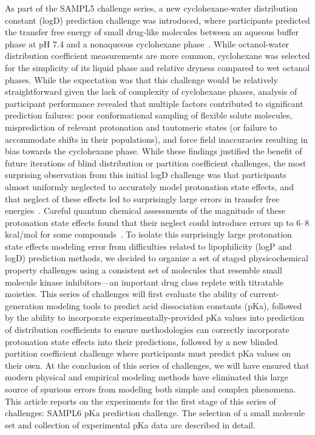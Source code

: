 \documentclass[9pt,lineno]{elife}
\begin{document}
As part of the SAMPL5 challenge series, a new cyclohexane-water distribution constant (logD) prediction challenge was introduced, where participants predicted the transfer free energy of small drug-like molecules between an aqueous buffer phase at pH 7.4 and a nonaqueous cyclohexane phase~\citep{bannan_blind_2016,rustenburg_measuring_2016}. 
While octanol-water distribution coefficient measurements are more common, cyclohexane was selected for the simplicity of its liquid phase and relative dryness compared to wet octanol phases.
While the expectation was that this challenge would be relatively straightforward given the lack of complexity of cyclohexane phases, analysis of participant performance revealed that multiple factors contributed to significant prediction failures: poor conformational sampling of flexible solute molecules, misprediction of relevant protonation and tautomeric states (or failure to accommodate shifts in their populations), and force field inaccuracies resulting in bias towards the cyclohexane phase.
While these findings justified the benefit of future iterations of blind distribution or partition coefficient challenges, the most surprising observation from this initial logD challenge was that participants almost uniformly neglected to accurately model protonation state effects, and that neglect of these effects led to surprisingly large errors in transfer free energies~\citep{bannan_blind_2016, pickard_blind_2016,rustenburg_measuring_2016}. 
Careful quantum chemical assessments of the magnitude of these protonation state effects found that their neglect could introduce errors up to 6--8 kcal/mol for some compounds~\citep{pickard_blind_2016}.  
To isolate this surprisingly large protonation state effects modeling error from difficulties related to lipophilicity (logP and logD) prediction methods, we decided to organize a set of staged physicochemical property challenges using a consistent set of molecules that resemble small molecule kinase inhibitors---an important drug class replete with titratable moieties.
This series of challenges will first evaluate the ability of current-generation modeling tools to predict acid dissociation constants (pKa), followed by the ability to incorporate experimentally-provided pKa values into prediction of distribution coefficients to ensure methodologies can correctly incorporate protonation state effects into their predictions, followed by a new blinded partition coefficient challenge where participants must predict pKa values on their own.
At the conclusion of this series of challenges, we will have ensured that modern physical and empirical modeling methods have eliminated this large source of spurious errors from modeling both simple and complex phenomena.
This article reports on the experiments for the first stage of this series of challenges: SAMPL6 pKa prediction challenge. The selection of a small molecule set and collection of experimental pKa data are described in detail.
\end{document}
